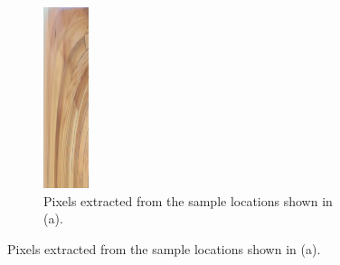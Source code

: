 \documentclass{article}
\begin{document}
\begin{figure}[htbp]
\begin{subfigure}[t]{0.12\textwidth}
		\includegraphics[width=\textwidth]{img/polar_samples.png}
		\caption{Pixels extracted from the sample locations shown in (a).}
	\end{subfigure}
\end{figure}
\end{document}
